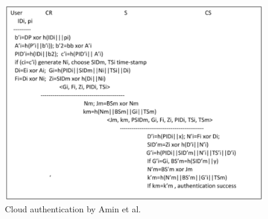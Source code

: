\newpage

\begin{figure}[!ht]
\centering
\includegraphics[scale=.9]{src/Figures/chap2/8.eps}
\caption{Cloud authentication by Amin et al. \cite{chap2-key20}}\label{chap2-fig8}
\end{figure}

